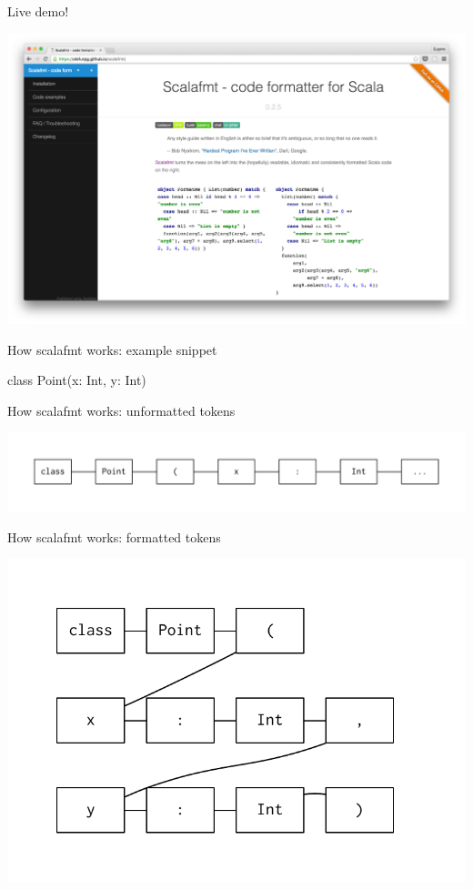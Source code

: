 \documentclass[svgnames,dvipsnames,hyperref={bookmarks=false},usepdftitle=false]{beamer}
\begin{document}
\begin{frame}[c, fragile]{Live demo!}
\vskip20pt
\begin{center}
\includegraphics[width=0.9\linewidth]{scalafmt.png}
\end{center}
\end{frame}

\begin{frame}{How scalafmt works: example snippet}
\begin{semiverbatim}
class Point(x: Int, y: Int)
\end{semiverbatim}
\end{frame}

\begin{frame}[c, fragile]{How scalafmt works: unformatted tokens}
\vskip20pt
\begin{center}
\includegraphics[width=0.9\linewidth]{tokens-raw.pdf}
\end{center}
\end{frame}

\begin{frame}[c, fragile]{How scalafmt works: formatted tokens}
\vskip20pt
\begin{center}
\includegraphics[width=0.9\linewidth]{tokens-formatted.pdf}
\end{center}
\end{frame}
\end{document}
